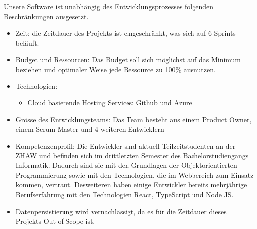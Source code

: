 \documentclass[a4paper, 11pt]{scrartcl}
\begin{document}
Unsere Software ist unabhängig des Entwicklungsprozesses folgenden Beschränkungen ausgesetzt.
\begin{itemize}
\item Zeit: die Zeitdauer des Projekts ist eingeschränkt, was sich auf 6 Sprints beläuft.
\item Budget und Ressourcen: Das Budget soll sich möglichst auf das Minimum beziehen und optimaler Weise jede Ressource zu 100\% ausnutzen.
\item Technologien:
	\begin{itemize}

	\item Cloud basierende Hosting Services: Github und Azure

	\end{itemize}
\item Grösse des Entwicklungsteams: Das Team besteht aus einem Product Owner, einem Scrum Master und 4 weiteren Entwicklern
\item Kompetenzenprofil: Die Entwickler sind aktuell Teilzeitstudenten an der ZHAW und befinden sich im drittletzten Semester des Bachelorstudiengangs Informatik. Dadurch sind sie mit den Grundlagen der Objektorientierten Programmierung sowie mit den Technologien, die im Webbereich zum Einsatz kommen, vertraut. Desweiteren haben einige Entwickler bereits mehrjährige Berufserfahrung mit den Technologien React, TypeScript und Node JS.
\item Datenpersistierung wird vernachlässigt, da es für die Zeitdauer dieses Projekts Out-of-Scope ist.
\end{itemize}
\end{document}
